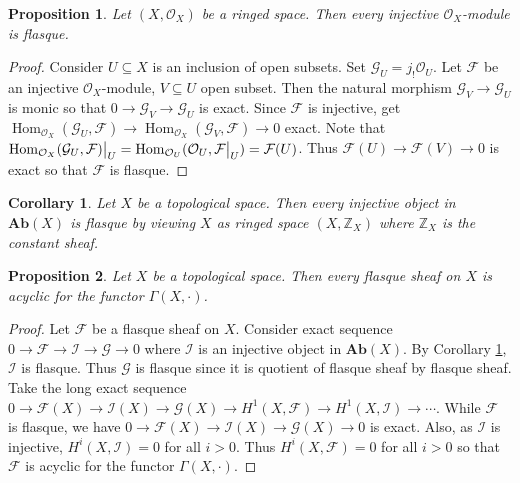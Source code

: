 \documentclass{ctexart}
\newtheorem{proposition}{Proposition}[section]
\newtheorem{corollary}{Corollary}[section]
\renewcommand{\hom}{\operatorname{Hom}}
\newcommand{\abeliangroups}{\mathbf{Ab}}
\begin{document}
\begin{proposition}
    Let $(X, \mathcal{O}_{X})$ be a ringed space.
    Then every injective $\mathcal{O}_{X}$-module is flasque.
    \label{Proposition 7.4}
    \vspace{-\baselineskip} %
\end{proposition}
\begin{proof}
    Consider $U \subseteq X$ is an inclusion of open subsets.
    Set $\mathcal{G}_{U} = j_{!}\mathcal{O}_{U}$.
    Let $\mathcal{F}$ be an injective $\mathcal{O}_{X}$-module, $V \subseteq U$ open subset.
    Then the natural morphism $\mathcal{G}_{V} \longrightarrow \mathcal{G}_{U}$ is monic so that $0 \longrightarrow \mathcal{G}_{V} \longrightarrow \mathcal{G}_{U}$ is exact.
    Since $\mathcal{F}$ is injective, get $\hom_{\mathcal{O}_{X}}(\mathcal{G}_{U}, \mathcal{F}) \longrightarrow \hom_{\mathcal{O}_{X}}(\mathcal{G}_{V}, \mathcal{F}) \longrightarrow 0$ exact.
    Note that $\hom_{\mathcal{O}_{X}}(\mathcal{G}_{U}, \mathcal{F})\big{|}_{U} = \hom_{\mathcal{O}_{U}}(\mathcal{O}_{U}, \mathcal{F}\big{|}_{U}) = \mathcal{F}(U)$.
    Thus $\mathcal{F}(U) \longrightarrow \mathcal{F}(V) \longrightarrow 0$ is exact so that $\mathcal{F}$ is flasque.
\end{proof}
\begin{corollary}
    Let $X$ be a topological space.
    Then every injective object in $\abeliangroups (X)$ is flasque by viewing $X$ as ringed space $(X, \mathbb{Z}_{X})$ where $\mathbb{Z}_{X}$ is the constant sheaf.
    \label{Corollary 7.1}
\end{corollary}
\begin{proposition}
    Let $X$ be a topological space.
    Then every flasque sheaf on $X$ is acyclic for the functor $\Gamma(X, \cdot)$.
    \label{Proposition 7.5}
\end{proposition}
\begin{proof}
    Let $\mathcal{F}$ be a flasque sheaf on $X$.
    Consider exact sequence $0 \longrightarrow \mathcal{F} \longrightarrow \mathcal{I} \longrightarrow \mathcal{G} \longrightarrow 0$ where $\mathcal{I}$ is an injective object in $\abeliangroups (X)$.
    By Corollary \ref{Corollary 7.1}, $\mathcal{I}$ is flasque.
    Thus $\mathcal{G}$ is flasque since it is quotient of flasque sheaf by flasque sheaf.
    Take the long exact sequence $0 \longrightarrow \mathcal{F}(X) \longrightarrow \mathcal{I}(X) \longrightarrow \mathcal{G}(X) \longrightarrow H^{1}(X, \mathcal{F}) \longrightarrow H^{1}(X, \mathcal{I}) \longrightarrow \cdots$.
    While $\mathcal{F}$ is flasque, we have $0 \longrightarrow \mathcal{F}(X) \longrightarrow \mathcal{I}(X) \longrightarrow \mathcal{G}(X) \longrightarrow 0$ is exact.
    Also, as $\mathcal{I}$ is injective, $H^{i}(X, \mathcal{I}) = 0$ for all $i > 0$.
    Thus $H^{i}(X, \mathcal{F}) = 0$ for all $i > 0$ so that $\mathcal{F}$ is acyclic for the functor $\Gamma(X, \cdot)$. 
\end{proof}
\end{document}
